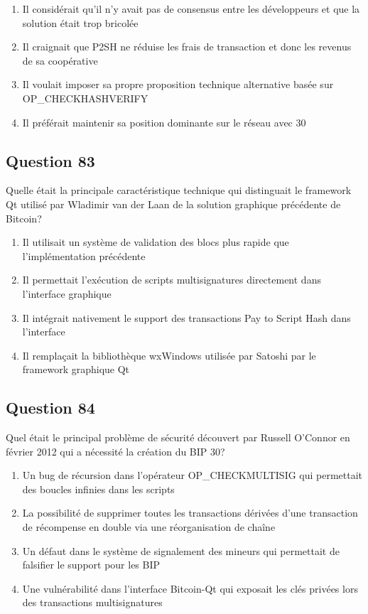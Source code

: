 \documentclass[12pt,a4paper]{article}
\begin{document}
\begin{enumerate}[label=\Alph*., leftmargin=*]
\item Il considérait qu'il n'y avait pas de consensus entre les développeurs et que la solution était trop bricolée
\item Il craignait que P2SH ne réduise les frais de transaction et donc les revenus de sa coopérative
\item Il voulait imposer sa propre proposition technique alternative basée sur OP_CHECKHASHVERIFY
\item Il préférait maintenir sa position dominante sur le réseau avec 30%
\end{enumerate}

\bigskip


\subsection*{Question 83}
Quelle était la principale caractéristique technique qui distinguait le framework Qt utilisé par Wladimir van der Laan de la solution graphique précédente de Bitcoin?

\begin{enumerate}[label=\Alph*., leftmargin=*]
\item Il utilisait un système de validation des blocs plus rapide que l'implémentation précédente
\item Il permettait l'exécution de scripts multisignatures directement dans l'interface graphique
\item Il intégrait nativement le support des transactions Pay to Script Hash dans l'interface
\item Il remplaçait la bibliothèque wxWindows utilisée par Satoshi par le framework graphique Qt
\end{enumerate}

\bigskip


\subsection*{Question 84}
Quel était le principal problème de sécurité découvert par Russell O'Connor en février 2012 qui a nécessité la création du BIP 30?

\begin{enumerate}[label=\Alph*., leftmargin=*]
\item Un bug de récursion dans l'opérateur OP_CHECKMULTISIG qui permettait des boucles infinies dans les scripts
\item La possibilité de supprimer toutes les transactions dérivées d'une transaction de récompense en double via une réorganisation de chaîne
\item Un défaut dans le système de signalement des mineurs qui permettait de falsifier le support pour les BIP
\item Une vulnérabilité dans l'interface Bitcoin-Qt qui exposait les clés privées lors des transactions multisignatures
\end{enumerate}
\end{document}

